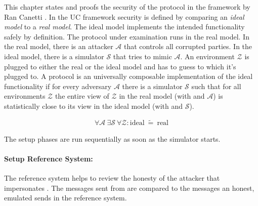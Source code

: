 \label{sec:security}

This chapter states and proofs the security of the protocol in the
 framework by Ran Canetti \cite{canetti05}.
In the UC framework security is defined by comparing an \emph{ideal model} to a
\emph{real model}. The ideal model implements the intended functionality
\JWfuncSym{}{} safely by definition. The protocol under examination runs in the
real model. In the real model, there is an attacker $\mathcal{A}$ that controls
all corrupted parties.  In the ideal model, there is a simulator $\mathcal{S}$
that tries to mimic $\mathcal{A}$. An environment $\mathcal{Z}$ is plugged to
either the real or the ideal model and has to guess to which it's plugged to. A
protocol \JWprotoSym{}{} is an universally composable implementation of the
ideal functionality if for every adversary $\mathcal{A}$ there is a
simulator $\mathcal{S}$ such that for all environments $\mathcal{Z}$ the entire
view of $\mathcal{Z}$ in the real model (with \JWprotoSym{}{} and $\mathcal{A}$)
is statistically close to its view in the ideal model (with \JWfuncSym{}{} and
$\mathcal{S}$).

\begin{align*}
%
\forall \mathcal{A}\ \exists \mathcal{S}\ \forall \mathcal{Z} :
\text{ideal}\ \widetilde{=}\ \text{real}
%
\end{align*}

%
%
\label{sec:simulators}


\label{sec:simulator-david}

The setup phases are run sequentially as soon as the simulator starts.

\paragraph{Setup Reference System:}

The reference system helps to review the honesty of the attacker \JWadv{}
that impersonates \JWpTwo{}. The messages sent from \JWadv{} are compared
to the messages an honest, emulated \JWpTwo{} sends in the reference system.

